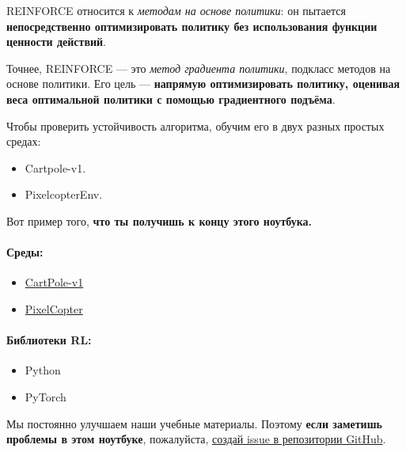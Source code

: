 \documentclass[11pt,a4paper]{article}
\begin{document}
REINFORCE относится к \emph{методам на основе политики}: он пытается \textbf{непосредственно оптимизировать политику без использования функции ценности действий}.

Точнее, REINFORCE --- это \emph{метод градиента политики}, подкласс методов на основе политики. Его цель --- \textbf{напрямую оптимизировать политику, оценивая веса оптимальной политики с помощью градиентного подъёма}.

Чтобы проверить устойчивость алгоритма, обучим его в двух разных простых средах:

\begin{itemize}
\tightlist
\item
  Cartpole-v1.
\item
  PixelcopterEnv.
\end{itemize}

Вот пример того, \textbf{что ты получишь к концу этого ноутбука.}


\paragraph{Среды:}\label{environments}

\begin{itemize}
\tightlist
\item
  \href{https://www.gymlibrary.dev/environments/classic_control/cart_pole/}{CartPole-v1}
\item
  \href{https://pygame-learning-environment.readthedocs.io/en/latest/user/games/pixelcopter.html}{PixelCopter}
\end{itemize}

\paragraph{Библиотеки RL:}\label{rl-library}

\begin{itemize}
\tightlist
\item
  Python
\item
  PyTorch
\end{itemize}

Мы постоянно улучшаем наши учебные материалы. Поэтому \textbf{если заметишь проблемы в этом ноутбуке}, пожалуйста, \href{https://github.com/huggingface/deep-rl-class/issues}{создай issue в репозитории GitHub}.
\end{document}
